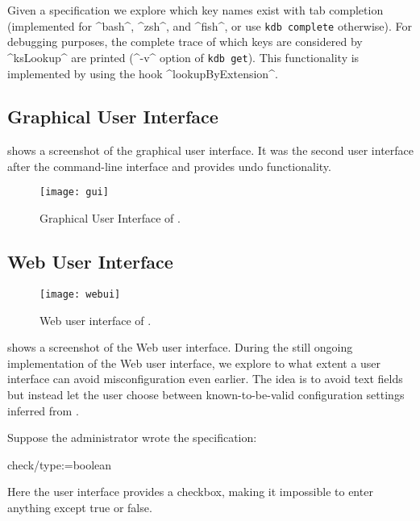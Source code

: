 Given a specification we explore which key names exist with tab completion (implemented for ^bash^, ^zsh^, and ^fish^, or use \lstinline[language=bash,morekeywords={complete}]^kdb complete^ otherwise).
For debugging purposes, the complete trace of which keys are considered by ^ksLookup^ are printed (^-v^ option of \lstinline[language=bash,morekeywords={get}]^kdb get^).
This functionality is implemented by using the hook ^lookupByExtension^.


\subsection{Graphical User Interface}

 shows a screenshot of the graphical user interface.
It was the second user interface after the command-line interface and provides undo functionality.

\begin{figure}[htp]
\centering
\texttt{[image: gui]}
\caption{Graphical User Interface of \elektra{}.}
\label{fig:gui}
\end{figure}

\subsection{Web User Interface}


\begin{figure}[htp]
\centering
\texttt{[image: webui]}
\caption{Web user interface of \elektra{}.}
\label{fig:webui}
\end{figure}

 shows a screenshot of the Web user interface.
During the still ongoing implementation of the Web user interface, we explore to what extent a user interface can avoid misconfiguration even earlier.
The idea is to avoid text fields but instead let the user choose between known-to-be-valid configuration settings inferred from .
\begin{example}
Suppose the administrator wrote the specification:

\begin{code}
  check/type:=boolean
\end{code}

Here the user interface provides a checkbox, making it impossible to enter anything except true or false.
\end{example}


